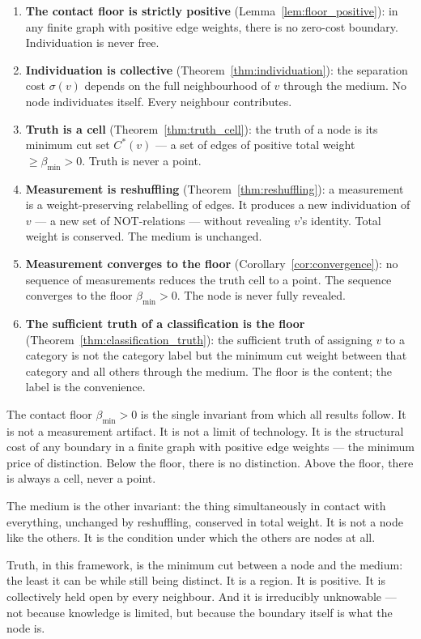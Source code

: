 \documentclass[12pt, a4paper]{article}
\theoremstyle{plain}
\theoremstyle{definition}
\theoremstyle{remark}
\newcommand{\bmin}{\beta_{\min}}
\begin{document}
\begin{enumerate}
\item \textbf{The contact floor is strictly positive}
  (Lemma~\ref{lem:floor_positive}): in any finite graph with positive edge
  weights, there is no zero-cost boundary. Individuation is never free.

\item \textbf{Individuation is collective} (Theorem~\ref{thm:individuation}):
  the separation cost $\sigma(v)$ depends on the full neighbourhood of $v$
  through the medium. No node individuates itself. Every neighbour
  contributes.

\item \textbf{Truth is a cell} (Theorem~\ref{thm:truth_cell}): the truth of
  a node is its minimum cut set $C^*(v)$ --- a set of edges of positive
  total weight $\geq \bmin > 0$. Truth is never a point.

\item \textbf{Measurement is reshuffling} (Theorem~\ref{thm:reshuffling}):
  a measurement is a weight-preserving relabelling of edges. It produces
  a new individuation of $v$ --- a new set of NOT-relations --- without
  revealing $v$'s identity. Total weight is conserved. The medium is
  unchanged.

\item \textbf{Measurement converges to the floor}
  (Corollary~\ref{cor:convergence}): no sequence of measurements reduces
  the truth cell to a point. The sequence converges to the floor $\bmin > 0$.
  The node is never fully revealed.

\item \textbf{The sufficient truth of a classification is the floor}
  (Theorem~\ref{thm:classification_truth}): the sufficient truth of
  assigning $v$ to a category is not the category label but the minimum
  cut weight between that category and all others through the medium.
  The floor is the content; the label is the convenience.
\end{enumerate}

The contact floor $\bmin > 0$ is the single invariant from which all
results follow. It is not a measurement artifact. It is not a limit of
technology. It is the structural cost of any boundary in a finite graph
with positive edge weights --- the minimum price of distinction. Below the
floor, there is no distinction. Above the floor, there is always a cell,
never a point.

The medium is the other invariant: the thing simultaneously in contact with
everything, unchanged by reshuffling, conserved in total weight. It is not
a node like the others. It is the condition under which the others are nodes
at all.

Truth, in this framework, is the minimum cut between a node and the medium:
the least it can be while still being distinct. It is a region. It is positive.
It is collectively held open by every neighbour. And it is irreducibly
unknowable --- not because knowledge is limited, but because the boundary
itself is what the node is.



\end{document}
